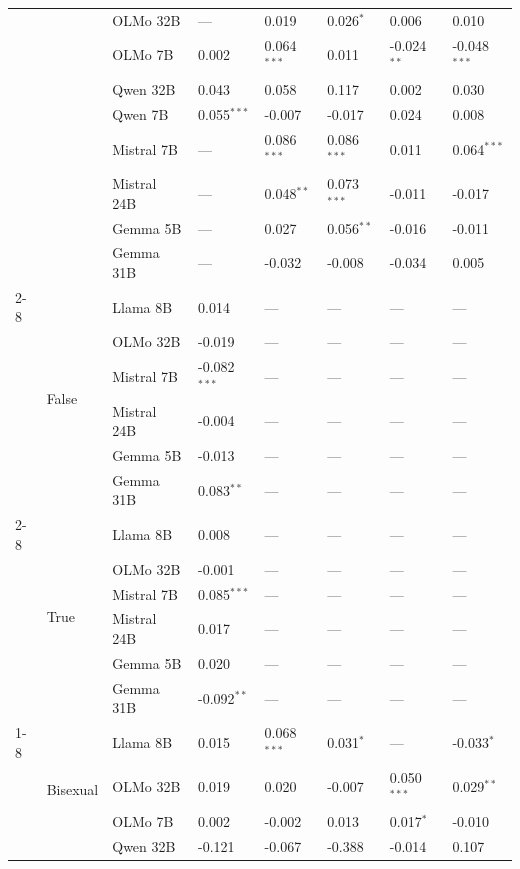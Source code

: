 \begin{longtable}[t]{llllllll}
 &  & OLMo 32B & --- & 0.019 & 0.026$^{*}$ & 0.006 & 0.010 \\
 &  & OLMo 7B & 0.002 & 0.064$^{***}$ & 0.011 & -0.024$^{**}$ & -0.048$^{***}$ \\
 &  & Qwen 32B & 0.043 & 0.058 & 0.117 & 0.002 & 0.030 \\
 &  & Qwen 7B & 0.055$^{***}$ & -0.007 & -0.017 & 0.024 & 0.008 \\
 &  & Mistral 7B & --- & 0.086$^{***}$ & 0.086$^{***}$ & 0.011 & 0.064$^{***}$ \\
 &  & Mistral 24B & --- & 0.048$^{**}$ & 0.073$^{***}$ & -0.011 & -0.017 \\
 &  & Gemma 5B & --- & 0.027 & 0.056$^{**}$ & -0.016 & -0.011 \\
 &  & Gemma 31B & --- & -0.032 & -0.008 & -0.034 & 0.005 \\
\cline{2-8}
 & \multirow[t]{6}{*}{False} & Llama 8B & 0.014 & --- & --- & --- & --- \\
 &  & OLMo 32B & -0.019 & --- & --- & --- & --- \\
 &  & Mistral 7B & -0.082$^{***}$ & --- & --- & --- & --- \\
 &  & Mistral 24B & -0.004 & --- & --- & --- & --- \\
 &  & Gemma 5B & -0.013 & --- & --- & --- & --- \\
 &  & Gemma 31B & 0.083$^{**}$ & --- & --- & --- & --- \\
\cline{2-8}
 & \multirow[t]{6}{*}{True} & Llama 8B & 0.008 & --- & --- & --- & --- \\
 &  & OLMo 32B & -0.001 & --- & --- & --- & --- \\
 &  & Mistral 7B & 0.085$^{***}$ & --- & --- & --- & --- \\
 &  & Mistral 24B & 0.017 & --- & --- & --- & --- \\
 &  & Gemma 5B & 0.020 & --- & --- & --- & --- \\
 &  & Gemma 31B & -0.092$^{**}$ & --- & --- & --- & --- \\
\cline{1-8} \cline{2-8}
\multirow[t]{45}{*}{Sexual Orientation} & \multirow[t]{9}{*}{Bisexual} & Llama 8B & 0.015 & 0.068$^{***}$ & 0.031$^{*}$ & --- & -0.033$^{*}$ \\
 &  & OLMo 32B & 0.019 & 0.020 & -0.007 & 0.050$^{***}$ & 0.029$^{**}$ \\
 &  & OLMo 7B & 0.002 & -0.002 & 0.013 & 0.017$^{*}$ & -0.010 \\
 &  & Qwen 32B & -0.121 & -0.067 & -0.388 & -0.014 & 0.107 \\

\end{longtable}
